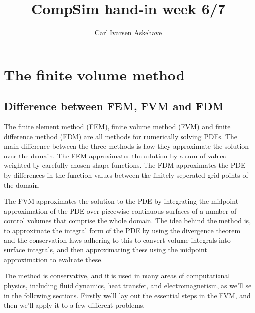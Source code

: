 \documentclass[acmtog]{acmart}
\begin{document}
\title{CompSim hand-in week 6/7}
\author{Carl Ivarsen Askehave}

\maketitle
\thispagestyle{empty}
\section*{The finite volume method}
\subsection*{Difference between FEM, FVM and FDM}
The finite element method (FEM), finite volume method (FVM) and finite difference method (FDM) are all methods for numerically solving PDEs. The main difference between the three methods is how they approximate the solution over the domain. The FEM approximates the solution by a sum of values weighted by carefully chosen shape functions. The FDM approximates the PDE by differences in the function values between the finitely seperated grid points of the domain.

The FVM approximates the solution to the PDE by integrating the midpoint approximation of the PDE over piecewise continuous surfaces of a number of control volumes that comprise the whole domain. The idea behind the method is, to approximate the integral form of the PDE by using the divergence theorem and the conservation laws adhering to this to convert volume integrals into surface integrals, and then approximating these using the midpoint approximation to evaluate these.

The method is conservative, and it is used in many areas of computational physics, including fluid dynamics, heat transfer, and electromagnetism, as we'll se in the following sections. Firstly we'll lay out the essential steps in the FVM, and then we'll apply it to a few different problems.
\end{document}
